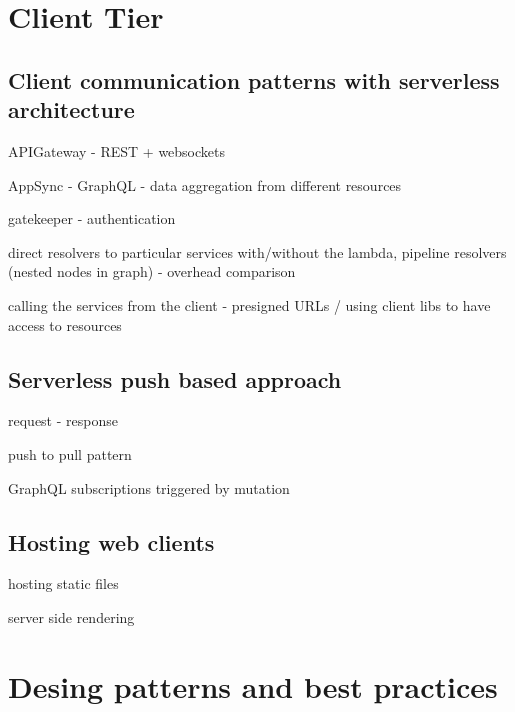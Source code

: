 \section{Client Tier}

\subsection{Client communication patterns with serverless architecture}

APIGateway - REST + websockets

AppSync - GraphQL - data aggregation from different resources

gatekeeper - authentication

direct resolvers to particular services with/without the lambda, pipeline resolvers (nested nodes in graph) - overhead comparison

calling the services from the client - presigned URLs / using client libs to have access to resources

\subsection{Serverless push based approach}

request - response

push to pull pattern

GraphQL subscriptions triggered by mutation

\subsection{Hosting web clients}

hosting static files

server side rendering

\section{Desing patterns and best practices}
